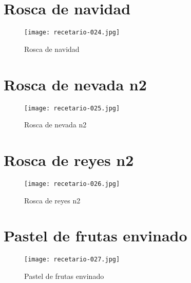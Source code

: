 \documentclass[12pt,letterpaper]{article}
\begin{document}
\newpage

  \section{Rosca de navidad}
  
    \begin{figure}[H]
      \vspace{2pt}
    \texttt{[image: recetario-024.jpg]}
      \caption{Rosca de navidad}
      
    \end{figure}


\newpage

  \section{Rosca de nevada n2}
  
    \begin{figure}[H]
      \vspace{2pt}
    \texttt{[image: recetario-025.jpg]}
      \caption{Rosca de nevada n2}
      
    \end{figure}

\newpage

  \section{Rosca de reyes n2}
  
    \begin{figure}[H]
      \vspace{2pt}
    \texttt{[image: recetario-026.jpg]}
      \caption{Rosca de reyes n2}
      
    \end{figure}

\newpage

  \section{Pastel de frutas envinado}
  
    \begin{figure}[H]
      \vspace{2pt}
    \texttt{[image: recetario-027.jpg]}
      \caption{Pastel de frutas envinado}
      
    \end{figure}
\end{document}
